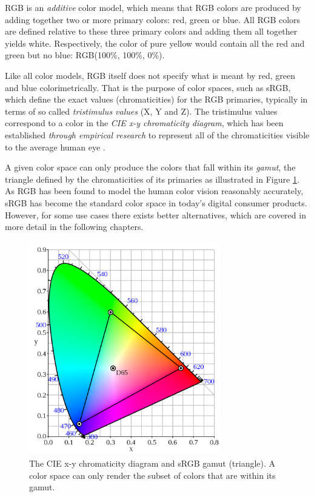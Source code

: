 \documentclass[thesis.tex]{subfiles}
\begin{document}
RGB is an \textit{additive} color model, which means that RGB colors are produced by adding together two or more primary colors: red, green or blue. All RGB colors are defined relative to these three primary colors and adding them all together yields white. Respectively, the color of pure yellow would contain all the red and green but no blue: RGB(100\%, 100\%, 0\%).

Like all color models, RGB itself does not specify what is meant by red, green and blue colorimetrically. That is the purpose of color spaces, such as sRGB, which define the exact values (chromaticities) for the RGB primaries, typically in terms of so called \textit{tristimulus values} (X, Y and Z). The tristimulus values correspond to a color in the \textit{CIE x-y chromaticity diagram}, which has been established \emph{through empirical research} to represent all of the chromaticities visible to the average human eye \cite{cie}.

A given color space can only produce the colors that fall within its \textit{gamut}, the triangle defined by the chromaticities of its primaries as illustrated in Figure \ref{figure:srgb}. As RGB has been found to model the human color vision reasonably accurately, sRGB has become the standard color space in today's digital consumer products. However, for some use cases there exists better alternatives, which are covered in more detail in the following chapters.

\begin{figure}[ht]
\centering \includegraphics[width=0.75\textwidth]{images/srgb}
\caption{The CIE x-y chromaticity diagram and sRGB gamut (triangle). A color space can only render the subset of colors that are within its gamut.\label{figure:srgb}}
\end{figure}
\end{document}
